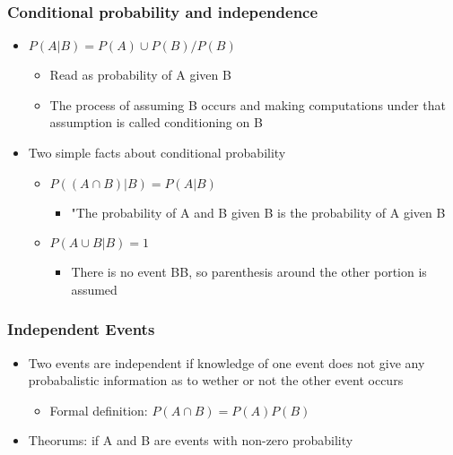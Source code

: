 \documentclass[
]{article}
\providecommand{\tightlist}{%
  \setlength{\itemsep}{0pt}\setlength{\parskip}{0pt}}
\begin{document}
\hypertarget{conditional-probability-and-independence}{%
\subsubsection{Conditional probability and
independence}\label{conditional-probability-and-independence}}

\begin{itemize}
\tightlist
\item
  \(P(A | B) = P(A) \cup P(B) / P(B)\)

  \begin{itemize}
  \tightlist
  \item
    Read as probability of A given B
  \item
    The process of assuming B occurs and making computations under that
    assumption is called conditioning on B
  \end{itemize}
\item
  Two simple facts about conditional probability

  \begin{itemize}
  \tightlist
  \item
    \(P((A \cap B) | B) = P(A|B)\)

    \begin{itemize}
    \tightlist
    \item
      "The probability of A and B given B is the probability of A given
      B
    \end{itemize}
  \item
    \(P(A \cup B|B) = 1\)

    \begin{itemize}
    \tightlist
    \item
      There is no event B\textbar B, so parenthesis around the other
      portion is assumed
    \end{itemize}
  \end{itemize}
\end{itemize}

\hypertarget{independent-events}{%
\subsubsection{Independent Events}\label{independent-events}}

\begin{itemize}
\tightlist
\item
  Two events are independent if knowledge of one event does not give any
  probabalistic information as to wether or not the other event occurs

  \begin{itemize}
  \tightlist
  \item
    Formal definition: \(P(A \cap B) = P(A)P(B)\)
  \end{itemize}
\item
  Theorums: if A and B are events with non-zero probability
\end{itemize}
\end{document}
